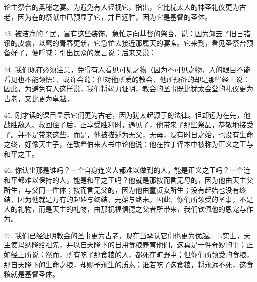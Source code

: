 论主祭台的奥秘之宴。为避免有人轻视它，指出，它比犹太人的神圣礼仪更为古老，因为在的祭献中已预显了它，并且远胜，因为它是基督的圣体。\par

43. 被洁净的子民，富有这些装饰，急忙走向基督的祭台，说：因为卸去了旧日错谬的皮囊，以鹰的青春更新，它急忙去接近那属天的宴席。它来到，看见圣祭台预备好了，便呼喊：引出民众的发言说：后来又说：\par

44. 我们现在必须注意，免得有人看见可见之物（因为不可见之物，人的眼目不能看见也不能领悟），或许会说：但对他所爱的教会，他所预备的却是那些经上说：因此，为避免有人这样说，我们将竭力证明，教会的圣事既比犹太会堂的礼仪更为古老，又比更为卓越。\par

45. 刚才读的课目显示它们更为古老，因为犹太起源于的法律。但却远为在先，他战胜敌人、救回侄子后，正享受胜利时，遇见了，他带来了那些祭品，恭敬地接受了。并不是带来这些，而是，他被描述为无父，无母，没有时日之始，也没有生命之终，好像天主子，在致希伯来人书中论他说：他在拉丁译本中被称为正义之王与和平之王。\par

46. 你认出那是谁吗？一个自身连义人都难以做到的人，能是正义之王吗？一个连和平都难以保持的人，能是和平之王吗？他就是那按而言无母的，因为他由天主父所生，与父同一性体；按而言无父的，因为他由童贞女所生；没有起始也没有终结，因为他就是万有的起始与终结，元始与终末。因此，你们所领受的圣事，不是人的礼物，而是天主的礼物，由那祝福信德之父者所带来，我们钦佩他的恩宠与作为。\par

47. 我们已经证明教会的圣事更为古老，现在当承认它们也更为优越。事实上，天主使玛纳降给祖先，并以自天降下的日用食粮养育他们，这真是一件奇妙的事；正如经上所说：然而，所有吃了那食粮的人，都死在旷野中；但你们所领受的食粮，那自天降下的生命之粮，却赐予永生的质素；谁若吃了这食粮，将永远不死，这食粮就是基督圣体。\par

